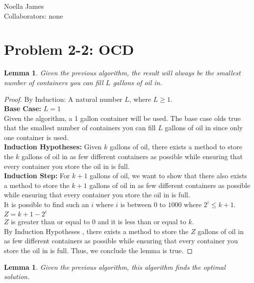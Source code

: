 \documentclass{article}
\theoremstyle{definition}
\theoremstyle{remark}
\theoremstyle{plain}
\newtheorem{lem}[thm]{Lemma}
\begin{document}
Noella James\\
Collaborators: none\\

\section{Problem 2-2: OCD}

\begin{lem}
Given the previous algorithm, the result will always be the smallest number of containers you can fill $L$ gallons of oil in.
\end{lem}

\begin{proof}
By Induction: A natural number $L$, where $L \ge 1$.\\
\textbf{Base Case:}  $L = 1$\\
Given the algorithm, a 1 gallon container will be used. The base case olds true that the smallest number of containers you can fill $L$ gallons of oil in since only one container is used.\\
\textbf{Induction Hypotheses:} 
Given $k$ gallons of oil, there exists a method to store the $k$ gallons of oil in as few different containers as possible while ensuring that every container you store the oil in is full.\\
\textbf{Induction Step:} 
For $k+1$ gallons of oil, we want to show that there also exists a method to store the $k+1$ gallons of oil in as few different containers as possible while ensuring that every container you store the oil in is full. \\
It is possible to find such an $i$ where $i$ is between $0$ to $1000$ where $2^i  \le k+1$.\\
$Z = k+1 - 2^i$\\
$Z$ is greater than or equal to $0$ and it is less than or equal to $k$.\\
By Induction Hypotheses , there exists a method to store the $Z$ gallons of oil in as few different containers as possible while ensuring that every container you store the oil in is full. Thus, we conclude the lemma is true.
\end{proof}

\begin{lem}
Given the previous algorithm, this algorithm finds the optimal solution.
\end{lem}
\end{document}
